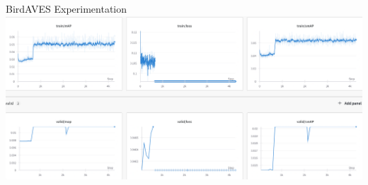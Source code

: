 \begin{frame}{BirdAVES Experimentation}
    \centering
    \includegraphics[height=1\textheight,width=1\textwidth,keepaspectratio]{images/BirdAVES_training.png}
\end{frame}

